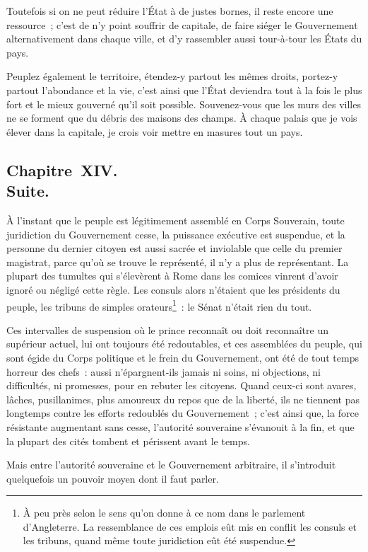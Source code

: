 \documentclass[french,twoside]{book} %
\begin{document}
Toutefois si on ne peut réduire l’État à de justes bornes, il reste encore une ressource ; c’est de n’y point souffrir de capitale, de faire siéger le Gouvernement alternativement dans chaque ville, et d’y rassembler aussi tour-à-tour les États du pays.\par
Peuplez également le territoire, étendez-y partout les mêmes droits, portez-y partout l’abondance et la vie, c’est ainsi que l’État deviendra tout à la fois le plus fort et le mieux gouverné qu’il soit possible. Souvenez-vous que les murs des villes ne se forment que du débris des maisons des champs. À chaque palais que je vois élever dans la capitale, je crois voir mettre en masures tout un pays.
\subsection[{Chapitre XIV. Suite.}]{Chapitre XIV. \\
Suite.}
\noindent À l’instant que le peuple est légitimement assemblé en Corps Souverain, toute juridiction du Gouvernement cesse, la puissance exécutive est suspendue, et la personne du dernier citoyen est aussi sacrée et inviolable que celle du premier magistrat, parce qu’où se trouve le représenté, il n’y a plus de représentant. La plupart des tumultes qui s’élevèrent à Rome dans les comices vinrent d’avoir ignoré ou négligé cette règle. Les consuls alors n’étaient que les présidents du peuple, les tribuns de simples orateurs\footnote{À peu près selon le sens qu’on donne à ce nom dans le parlement d’Angleterre. La ressemblance de ces emplois eût mis en conflit les consuls et les tribuns, quand même toute juridiction eût été suspendue.} : le Sénat n’était rien du tout.\par
Ces intervalles de suspension où le prince reconnaît ou doit reconnaître un supérieur actuel, lui ont toujours été redoutables, et ces assemblées du peuple, qui sont égide du Corps politique et le frein du Gouvernement, ont été de tout temps horreur des chefs : aussi n’épargnent-ils jamais ni soins, ni objections, ni difficultés, ni promesses, pour en rebuter les citoyens. Quand ceux-ci sont avares, lâches, pusillanimes, plus amoureux du repos que de la liberté, ils ne tiennent pas longtemps contre les efforts redoublés du Gouvernement ; c’est ainsi que, la force résistante augmentant sans cesse, l’autorité souveraine s’évanouit à la fin, et que la plupart des cités tombent et périssent avant le temps.\par
Mais entre l’autorité souveraine et le Gouvernement arbitraire, il s’introduit quelquefois un pouvoir moyen dont il faut parler.
\end{document}
